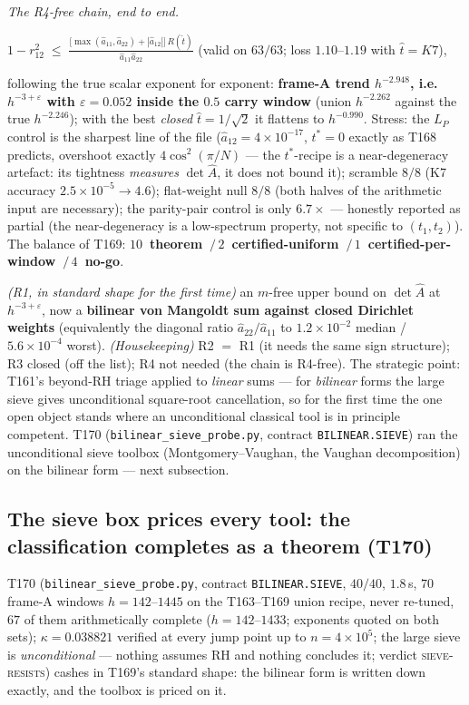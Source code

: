 \documentclass[11pt,a4paper]{article}
\begin{document}
\emph{The R4-free chain, end to end.}
\begin{keyeq}$\displaystyle
1-r_{12}^2\;\le\;\frac{\bigl[\max(\hat a_{11},\hat a_{22})+|\hat a_{12}|\bigr]\,
R(\hat t)}{\hat a_{11}\hat a_{22}}$
\quad(valid on $63/63$; loss $1.10$--$1.19$ with $\hat t=K7$),
\end{keyeq}
\noindent following the true scalar exponent for exponent: \textbf{frame-A
trend $h^{-2.948}$, i.e.\ $h^{-3+\varepsilon}$ with $\varepsilon=0.052$
inside the $0.5$ carry window} (union $h^{-2.262}$ against the true
$h^{-2.246}$); with the best \emph{closed} $\hat t=1/\sqrt2$ it flattens to
$h^{-0.990}$. Stress: the $L_P$ control is the sharpest line of the file
($\hat a_{12}=4\times10^{-17}$, $t^*=0$ exactly as T168 predicts, overshoot
exactly $4\cos^2(\pi/N)$ --- the $t^*$-recipe is a near-degeneracy artefact:
its tightness \emph{measures} $\det\hat A$, it does not bound it); scramble
$8/8$ (K7 accuracy $2.5\times10^{-5}\to4.6$); flat-weight null $8/8$ (both
halves of the arithmetic input are necessary); the parity-pair control is
only $6.7\times$ --- honestly reported as partial (the near-degeneracy is a
low-spectrum property, not specific to $(t_1,t_2)$). The balance of T169:
\textbf{$10$~theorem~$/\,2$~certified-uniform~$/\,1$~certified-per-window~$/\,
4$~no-go}.

\begin{keybox}
\emph{(R1, in standard shape for the first time)} an $m$-free upper bound on
$\det\hat A$ at $h^{-3+\varepsilon}$, now a \textbf{bilinear von Mangoldt
sum against closed Dirichlet weights} (equivalently the diagonal ratio
$\hat a_{22}/\hat a_{11}$ to $1.2\times10^{-2}$ median /
$5.6\times10^{-4}$ worst). \emph{(Housekeeping)} R2 $=$ R1 (it needs the
same sign structure); R3 closed (off the list); R4 not needed (the chain is
R4-free). The strategic point: T161's beyond-RH triage applied to
\emph{linear} sums --- for \emph{bilinear} forms the large sieve gives
unconditional square-root cancellation, so for the first time the one open
object stands where an unconditional classical tool is in principle
competent. T170 (\texttt{bilinear\_sieve\_probe.py}, contract
\texttt{BILINEAR.SIEVE}) ran the unconditional sieve toolbox
(Montgomery--Vaughan, the Vaughan decomposition) on the bilinear form ---
next subsection.
\end{keybox}

\subsection{The sieve box prices every tool: the classification completes as
a theorem (T170)}
T170 (\texttt{bilinear\_sieve\_probe.py}, contract \texttt{BILINEAR.SIEVE},
$40/40$, $1.8$\,s, $70$ frame-A windows $h=142$--$1445$ on the T163--T169
union recipe, never re-tuned, $67$ of them arithmetically complete
($h=142$--$1433$; exponents quoted on both sets); $\kappa=0.038821$ verified
at every jump point up to $n=4\times10^{5}$; the large sieve is
\emph{unconditional} --- nothing assumes RH and nothing concludes it;
verdict \textsc{sieve-resists}) cashes in T169's standard shape: the
bilinear form is written down exactly, and the toolbox is priced on it.
\end{document}
